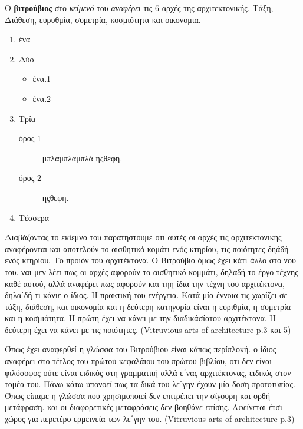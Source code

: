   
  Ο {\color{red}\textbf{βιτρούβιος}} στο \emph{κείμενό} του \textit{αναφέρει} τις 6 αρχές της αρχιτεκτονικής. Τάξη, Διάθεση, ευρυθμία, συμετρία, κοσμιότητα και οικονομια. \cite{scranton_vitruvius_1974, vitruvius-lefas}
  
\begin{enumerate}[noitemsep] %
  \item ένα
  \item Δύο
  
  \begin{itemize}
    \item ένα.1
    \item ένα.2
  \end{itemize}
  
  \item Τρία
  
    \begin{description}
      \item[όρος 1] μπλαμπλαμπλά ηςθεφη.
      \item[όρος 2] ηςθεφη.
    \end{description}
  
  \item Τέσσερα
\end{enumerate}

Διαβάζοντας το εκίεμνο του παρατηστουμε οτι αυτές οι αρχές τις αρχιτεκτονικής 
αναφέρονται και αποτελούν το αισθητικό κομάτι ενός κτηρίου, τις ποιότητες δηάδή 
ενός κτηρίου. Το προιόν του αρχιτέκτονα. Ο Βιτρούβιο όμως έχει κάτι άλλο στο 
νου του. ναι μεν λέει πως οι αρχές αφορούν το αισθητικό κομμάτι, δηλαδή το έργο 
τέχνης καθέ αυτού, αλλά αναφέρει πως αφορούν και τηη ίδια την τέχνη του 
αρχιτέκτονα, δηλα΄δή τι κάνιε ο ίδιος. Η πρακτική του ενέργεια. Κατά μία έννοια 
τις χωρίζει σε τάξη, διάθεση, και οικονομία και η δεύτερη κατηγορία είναι η 
ευριθμία, η συμετρία και η κοσμιότητα. Η πρώτη έχει να κάνει με την 
διαδικάσίατου αρχιτέκτονα. Η δεύτερη έχει να κάνει με τις ποιότητες. 
(Vitruvious arts of architecture p.3 και 5)
  
  Όπως έχει αναφερθεί η γλώσσα του Βιτρούβιου είναι κάπως περίπλοκή. ο ίδιος 
  αναφέρει στο τέτλος του πρώτου κεφαλάιου του πρώτου βιβλίου, οτι δεν είναι 
  φιλόσοφος ούτε είναι ειδικός στη γραμματιιή αλλά ε΄νας αρχιτέκτονας, ειδικός 
  στον τομέα του. Πάνω κάτω υπονοεί πως τα δικά του λε΄γην έχουν μία δοση 
  προτοτυπίας. Όπως είπαμε η γλώσσα που χρησιμοποιεί δεν επιτρέπει την σίγουρη 
  και ορθή μετάφραση. και οι διαφορετικές μεταφράσεις δεν βοηθάνε επίσης. 
  Αφείνεται έτσι χώρος για περετέρο ερμεινεία των λε΄γην του. (Vitruvious arts 
  of architecture p.3)
  
